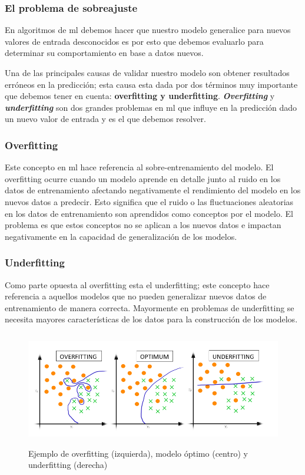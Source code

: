 \subsubsection{El problema de sobreajuste}\label{sub:validacion-modelo}

En algoritmos de \ac{ml} debemos hacer que nuestro modelo generalice para nuevos valores de entrada desconocidos es por esto que debemos evaluarlo para determinar su comportamiento en base a datos nuevos. 

Una de las principales causas de validar nuestro modelo son obtener resultados erróneos en la predicción; esta causa esta dada por dos términos muy importante que debemos tener en cuenta: \textbf{overfitting y underfitting}. \textit{\textbf{Overfitting}} y \textit{\textbf{underfitting}} son dos grandes problemas en \ac{ml} que influye en la predicción dado un nuevo valor de entrada y es el que debemos resolver. 

\subsubsection*{Overfitting}
Este concepto en \ac{ml} hace referencia al sobre-entrenamiento del modelo. El overfitting ocurre cuando un modelo aprende en detalle junto al ruido en los datos de entrenamiento afectando negativamente el rendimiento del modelo en los nuevos datos a predecir. Esto significa que el ruido o las fluctuaciones aleatorias en los datos de entrenamiento son aprendidos como conceptos por el modelo. El problema es que estos conceptos no se aplican a los nuevos datos e impactan negativamente en la capacidad de generalización de los modelos.

\subsubsection*{Underfitting}
Como parte opuesta al overfitting esta el  underfitting; este concepto hace referencia a aquellos modelos que no pueden generalizar nuevos datos de entrenamiento de manera correcta. Mayormente en problemas de underfitting se necesita mayores características de los datos para la construcción de los modelos.

\begin{figure}[h]
 \centering
  \includegraphics[height=5cm,keepaspectratio=true,clip=true]{imagenes/Logos/OverFUnderF.png}
  \caption{Ejemplo de overfitting (izquierda), modelo óptimo (centro) y underfitting (derecha)}
	\label{Fig: overUnder}
\end{figure}


